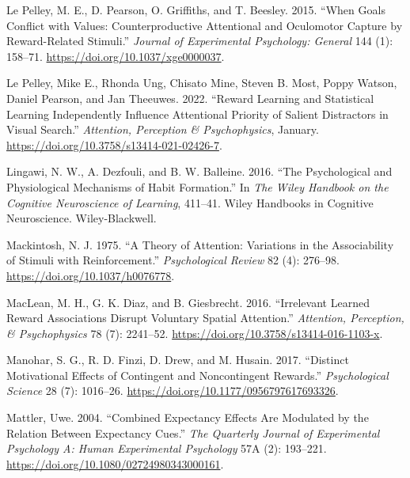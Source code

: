 \documentclass[11pt,halfline,a4paper,]{ouparticle}
\newlength{\cslhangindent}
\newlength{\cslentryspacingunit} %
\newenvironment{CSLReferences}[2] %
 {%
  \setlength{\parindent}{0pt}
  \ifodd #1
  \let\oldpar\par
  \def\par{\hangindent=\cslhangindent\oldpar}
  \fi
  \setlength{\parskip}{#2\cslentryspacingunit}
 }%
 {}
\begin{document}
\begin{CSLReferences}{1}{0}
\leavevmode{}%
Le Pelley, M. E., D. Pearson, O. Griffiths, and T. Beesley. 2015. {``When Goals Conflict with Values: {Counterproductive} Attentional and Oculomotor Capture by Reward-Related Stimuli.''} \emph{Journal of Experimental Psychology: General} 144 (1): 158--71. \url{https://doi.org/10.1037/xge0000037}.

\leavevmode{}%
Le Pelley, Mike E., Rhonda Ung, Chisato Mine, Steven B. Most, Poppy Watson, Daniel Pearson, and Jan Theeuwes. 2022. {``Reward Learning and Statistical Learning Independently Influence Attentional Priority of Salient Distractors in Visual Search.''} \emph{Attention, Perception \& Psychophysics}, January. \url{https://doi.org/10.3758/s13414-021-02426-7}.

\leavevmode{}%
Lingawi, N. W., A. Dezfouli, and B. W. Balleine. 2016. {``The Psychological and Physiological Mechanisms of Habit Formation.''} In \emph{The {Wiley} Handbook on the Cognitive Neuroscience of Learning}, 411--41. Wiley Handbooks in Cognitive Neuroscience. {Wiley-Blackwell}.

\leavevmode{}%
Mackintosh, N. J. 1975. {``A Theory of Attention: {Variations} in the Associability of Stimuli with Reinforcement.''} \emph{Psychological Review} 82 (4): 276--98. \url{https://doi.org/10.1037/h0076778}.

\leavevmode{}%
MacLean, M. H., G. K. Diaz, and B. Giesbrecht. 2016. {``Irrelevant Learned Reward Associations Disrupt Voluntary Spatial Attention.''} \emph{Attention, Perception, \& Psychophysics} 78 (7): 2241--52. \url{https://doi.org/10.3758/s13414-016-1103-x}.

\leavevmode{}%
Manohar, S. G., R. D. Finzi, D. Drew, and M. Husain. 2017. {``Distinct {Motivational Effects} of {Contingent} and {Noncontingent Rewards}.''} \emph{Psychological Science} 28 (7): 1016--26. \url{https://doi.org/10.1177/0956797617693326}.

\leavevmode{}%
Mattler, Uwe. 2004. {``Combined Expectancy Effects Are Modulated by the Relation Between Expectancy Cues.''} \emph{The Quarterly Journal of Experimental Psychology A: Human Experimental Psychology} 57A (2): 193--221. \url{https://doi.org/10.1080/02724980343000161}.


\end{CSLReferences}
\end{document}
